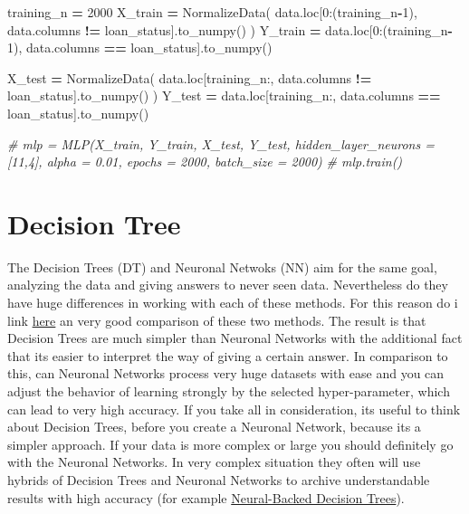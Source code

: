 \documentclass[
]{book}
\newenvironment{Shaded}{\begin{snugshade}}{\end{snugshade}}
\newcommand{\CommentTok}[1]{\textcolor[rgb]{0.56,0.35,0.01}{\textit{#1}}}
\newcommand{\DecValTok}[1]{\textcolor[rgb]{0.00,0.00,0.81}{#1}}
\newcommand{\NormalTok}[1]{#1}
\newcommand{\OperatorTok}[1]{\textcolor[rgb]{0.81,0.36,0.00}{\textbf{#1}}}
\newcommand{\StringTok}[1]{\textcolor[rgb]{0.31,0.60,0.02}{#1}}
\begin{document}
\begin{Shaded}
\begin{Highlighting}[]
\NormalTok{training\_n }\OperatorTok{=} \DecValTok{2000}
\NormalTok{X\_train }\OperatorTok{=}\NormalTok{ NormalizeData( data.loc[}\DecValTok{0}\NormalTok{:(training\_n}\OperatorTok{{-}}\DecValTok{1}\NormalTok{), data.columns }\OperatorTok{!=} \StringTok{\textquotesingle{}loan\_status\textquotesingle{}}\NormalTok{].to\_numpy() )}
\NormalTok{Y\_train }\OperatorTok{=}\NormalTok{ data.loc[}\DecValTok{0}\NormalTok{:(training\_n}\OperatorTok{{-}}\DecValTok{1}\NormalTok{), data.columns }\OperatorTok{==} \StringTok{\textquotesingle{}loan\_status\textquotesingle{}}\NormalTok{].to\_numpy()}

\NormalTok{X\_test }\OperatorTok{=}\NormalTok{ NormalizeData( data.loc[training\_n:, data.columns }\OperatorTok{!=} \StringTok{\textquotesingle{}loan\_status\textquotesingle{}}\NormalTok{].to\_numpy() )}
\NormalTok{Y\_test }\OperatorTok{=}\NormalTok{ data.loc[training\_n:, data.columns }\OperatorTok{==} \StringTok{\textquotesingle{}loan\_status\textquotesingle{}}\NormalTok{].to\_numpy()}


\CommentTok{\# mlp = MLP(X\_train, Y\_train, X\_test, Y\_test, hidden\_layer\_neurons = [11,4], alpha = 0.01, epochs = 2000, batch\_size = 2000)}
\CommentTok{\# mlp.train()}
\end{Highlighting}
\end{Shaded}

\hypertarget{decision-tree}{%
\chapter{Decision Tree}\label{decision-tree}}

The Decision Trees (DT) and Neuronal Netwoks (NN) aim for the same goal, analyzing the data and giving answers to never seen data. Nevertheless do they have huge differences in working with each of these methods. For this reason do i link \href{https://www.kdnuggets.com/2019/06/random-forest-vs-neural-network.html}{here} an very good comparison of these two methods. The result is that Decision Trees are much simpler than Neuronal Networks with the additional fact that its easier to interpret the way of giving a certain answer. In comparison to this, can Neuronal Networks process very huge datasets with ease and you can adjust the behavior of learning strongly by the selected hyper-parameter, which can lead to very high accuracy. If you take all in consideration, its useful to think about Decision Trees, before you create a Neuronal Network, because its a simpler approach. If your data is more complex or large you should definitely go with the Neuronal Networks. In very complex situation they often will use hybrids of Decision Trees and Neuronal Networks to archive understandable results with high accuracy (for example \href{https://bair.berkeley.edu/blog/2020/04/23/decisions/}{Neural-Backed Decision Trees}).
\end{document}
